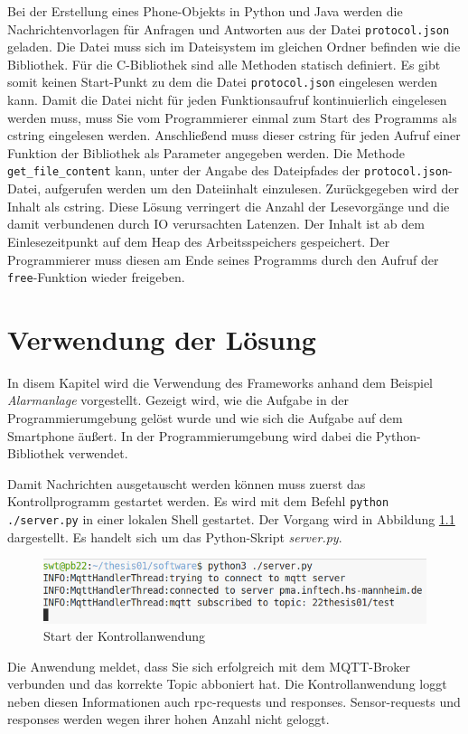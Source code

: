 \documentclass[11pt,a4paper]{report}
\begin{document}
Bei der Erstellung eines Phone-Objekts in Python und Java werden die Nachrichtenvorlagen für Anfragen und Antworten aus der Datei \texttt{protocol.json} geladen.
Die Datei muss sich im Dateisystem im gleichen Ordner befinden wie die Bibliothek.
Für die C-Bibliothek sind alle Methoden statisch definiert.
Es gibt somit keinen Start-Punkt zu dem die Datei \texttt{protocol.json} eingelesen werden kann.
Damit die Datei nicht für jeden Funktionsaufruf kontinuierlich eingelesen werden muss, muss Sie vom Programmierer einmal zum Start des Programms als cstring eingelesen werden.
Anschließend muss dieser cstring für jeden Aufruf einer Funktion der Bibliothek als Parameter angegeben werden.
Die Methode \texttt{get\_file\_content} kann, unter der Angabe des Dateipfades der \texttt{protocol.json}-Datei, aufgerufen werden um den Dateiinhalt einzulesen.
Zurückgegeben wird der Inhalt als cstring.
Diese Lösung verringert die Anzahl der Lesevorgänge und die damit verbundenen durch IO verursachten Latenzen.
Der Inhalt ist ab dem Einlesezeitpunkt auf dem Heap des Arbeitsspeichers gespeichert.
Der Programmierer muss diesen am Ende seines Programms durch den Aufruf der \texttt{free}-Funktion wieder freigeben.

\chapter{Verwendung der Lösung}
In disem Kapitel wird die Verwendung des Frameworks anhand dem Beispiel \textit{Alarmanlage} vorgestellt.
Gezeigt wird, wie die Aufgabe in der Programmierumgebung gelöst wurde und wie sich die Aufgabe auf dem Smartphone äußert.
In der Programmierumgebung wird dabei die Python-Bibliothek verwendet.

Damit Nachrichten ausgetauscht werden können muss zuerst das Kontrollprogramm gestartet werden.
Es wird mit dem Befehl \texttt{python ./server.py} in einer lokalen Shell gestartet.
Der Vorgang wird in Abbildung \ref{fig:start_controll_app} dargestellt.
Es handelt sich um das Python-Skript \textit{server.py}.
\begin{figure}[htbp]
  \centering
  \includegraphics[width=.8\textwidth]{images/server_logging}
  \caption{Start der Kontrollanwendung}
  \label{fig:start_controll_app}
\end{figure}
Die Anwendung meldet, dass Sie sich erfolgreich mit dem MQTT-Broker verbunden und das korrekte Topic abboniert hat.
Die Kontrollanwendung loggt neben diesen Informationen auch rpc-requests und responses.
Sensor-requests und responses werden wegen ihrer hohen Anzahl nicht geloggt.
\end{document}
